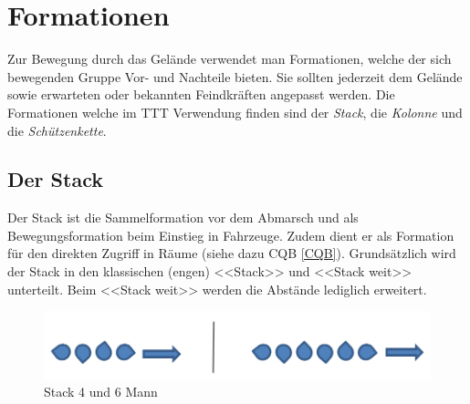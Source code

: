 \section{Formationen}
Zur Bewegung durch das Gelände verwendet man Formationen, welche der sich bewegenden Gruppe Vor- und Nachteile bieten. Sie sollten jederzeit dem Gelände sowie erwarteten oder bekannten Feindkräften angepasst werden. Die Formationen welche im TTT Verwendung finden sind der \textit{Stack}, die \textit{Kolonne} und die \textit{Schützenkette}. 

\subsection{Der Stack}
Der Stack ist die Sammelformation vor dem Abmarsch und als Bewegungsformation beim Einstieg in Fahrzeuge. Zudem dient er als Formation für den direkten Zugriff in Räume (siehe dazu CQB \autoref{CQB}). Grundsätzlich wird der Stack in den klassischen (engen) <<Stack>> und <<Stack weit>> unterteilt. Beim <<Stack weit>> werden die Abstände lediglich erweitert.\\
\begin{figure}[!htb]
	\centering
	\includegraphics[width=15cm]{./img/grundlagen/formationen/Stack.png}
	\caption{Stack 4 und 6 Mann}
\end{figure}

